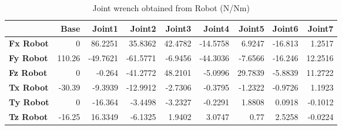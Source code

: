 \begin{table}[h!]
	\centering
	\caption{Joint wrench obtained from Robot (N/Nm)}
	\label{wrech_Robot_Pose7}
	\begin{tabular}{|l|r|r|r|r|r|r|r|r|}
		\hline
		\textbf{} & \textbf{Base} & \textbf{Joint1}  & \textbf{Joint2}  & \textbf{Joint3}  & \textbf{Joint4}  & \textbf{Joint5}  & \textbf{Joint6}  & \textbf{Joint7} \\ \hline
		\textbf{Fx Robot}  & 0        & 86.2251        & 35.8362        & 42.4782        & -14.5758        & 6.9247        & -16.813        & 1.2517 \\ \hline
		\textbf{Fy Robot}  & 110.26        & -49.7621        & -61.5771        & -6.9456        & -44.3036        & -7.6566        & -16.246        & 12.2516 \\ \hline
		\textbf{Fz Robot}  & 0        & -0.264        & -41.2772        & 48.2101        & -5.0996        & 29.7839        & -5.8839        & 11.2722 \\ \hline
		\textbf{Tx Robot}  & -30.39        & -9.3939        & -12.9912        & -2.7306        & -0.3795        & -1.2322        & -0.9726        & 1.1923 \\ \hline
		\textbf{Ty Robot}  & 0        & -16.364        & -3.4498        & -3.2327        & -0.2291        & 1.8808        & 0.0918        & -0.1012 \\ \hline
		\textbf{Tz Robot}  & -16.25        & 16.3349        & -6.1325        & 1.9402        & 3.0747        & 0.77        & 2.5258        & -0.0224 \\ \hline
	\end{tabular}
\end{table}

